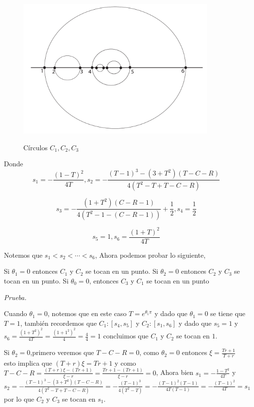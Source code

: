 \begin{figure}[h]
  \centering
  \includegraphics[width=10cm]{nuevosdiametros.pdf}\\
  \caption{C\'irculos $C_{1},C_{2},C_{3}$}\label{nuevosdiametros}
\end{figure}


Donde $$s_{1} = - \frac{(1-T)^{2}}{4T} , s_{2}= - \frac{(T-1)^{3} - (3 + T^{2})(T-C-R)}{4(T^{2} - T + T -C-R)}$$



$$s_{3}= -\frac{(1+T^{2})(C-R-1)}{4(T^{2}-1-(C-R-1))} + \frac{1}{2}, s_{4} = \frac{1}{2} $$

$$s_{5} = 1 , s_{6} = \frac{(1+ T)^{2}}{4T} $$


Notemos que $s_{1}< s_{2}< \cdots < s_{6}$, Ahora podemos probar lo siguiente,

\begin{prop} Si $\theta_{1} = 0$ entonces $C_{1}$  y $C_{2}$ se tocan en un punto. Si $\theta_{2} = 0 $ entonces $C_{2}$ y $C_{3}$ se tocan en un punto. Si $\theta_{0} = 0$, entonces $C_{3}$ y $C_{1}$ se tocan en un punto
\end{prop}

\textit{Prueba.}

Cuando $\theta_{1} = 0$, notemos que en este caso $T = e^{\theta_{1} \pi}$ y dado que $\theta_{1} = 0$ se tiene que $T =1$, tambi\'en recordemos que $C_{1}:[s_{4},s_{5}]$ y $C_{2}: [s_{1}, s_{6}]$ y dado que $s_{5} = 1 $ y $s_{6} = \frac{(1+ T^{2})^{2}}{4T} = \frac{(1 + 1^{2})^{2}}{4} = \frac{4}{4} = 1$ concluimos que $C_{1}$ y $C_{2}$ se tocan en $1$.

Si $\theta_{2} = 0$,primero veremos que $T-C-R = 0$, como $\theta_{2}=0$ entonces $\xi = \frac{Tr +1}{ T + r}$ esto implica que $(T+r) \xi = Tr +1$ y como $T-C-R = \frac{(T+r)\xi - (Tr+1)}{ \xi -r} = \frac{Tr+1 - ( Tr+1)}{\xi - r} =0$, Ahora bien $s_{1} = -\frac{1-T^{2}}{4T}$ y $s_{2} = -\frac{(T-1)^{3} - (3 + T^{2})(T-C-R)}{ 4(T^{2} - T + T-C-R)} =- \frac{(T-1)^{3}}{4(T^{2} - T)} =- \frac{(T-1)^{2} (T-1)}{4T (T-1)} = -\frac{(T-1)^{2}}{4T}= s_{1} $ por lo que $C_{2}$ y $C_{3}$ se tocan en $s_{1}$.

